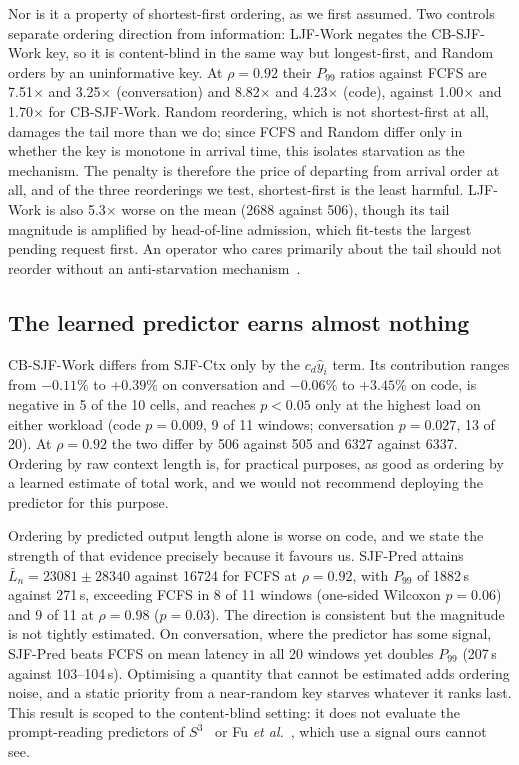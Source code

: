 \documentclass[conference,10pt,letterpaper]{IEEEtran}
\begin{document}
Nor is it a property of shortest-first ordering, as we first assumed. Two
controls separate ordering direction from information: LJF-Work negates the
CB-SJF-Work key, so it is content-blind in the same way but longest-first, and
Random orders by an uninformative key. At $\rho=0.92$ their $P_{99}$ ratios
against FCFS are 7.51$\times$ and 3.25$\times$ (conversation) and 8.82$\times$
and 4.23$\times$ (code), against 1.00$\times$ and 1.70$\times$ for CB-SJF-Work.
Random reordering, which is not shortest-first at all, damages the tail more
than we do; since FCFS and Random differ only in whether the key is monotone in
arrival time, this isolates starvation as the mechanism. The penalty is
therefore the price of departing from arrival order at all, and of the three
reorderings we test, shortest-first is the least harmful. LJF-Work is also
5.3$\times$ worse on the mean (2688 against 506), though its tail magnitude is
amplified by head-of-line admission, which fit-tests the largest pending request
first. An operator who cares primarily about the tail should not reorder without
an anti-starvation mechanism~\cite{wu2026fastserve,pecsched}.

\subsection{The learned predictor earns almost nothing}
CB-SJF-Work differs from SJF-Ctx only by the $c_d \hat{y}_i$ term. Its
contribution ranges from $-0.11\%$ to $+0.39\%$ on conversation and $-0.06\%$ to
$+3.45\%$ on code, is negative in 5 of the 10 cells, and reaches $p<0.05$ only
at the highest load on either workload (code $p=0.009$, 9 of 11 windows;
conversation $p=0.027$, 13 of 20). At $\rho=0.92$ the two differ by 506 against
505 and 6327 against 6337. Ordering by raw context length is, for practical
purposes, as good as ordering by a learned estimate of total work, and we would
not recommend deploying the predictor for this purpose.

Ordering by predicted output length alone is worse on code, and we state the
strength of that evidence precisely because it favours us. SJF-Pred attains
$\bar{L}_n = 23081 \pm 28340$ against 16724 for FCFS at $\rho=0.92$, with
$P_{99}$ of 1882\,s against 271\,s, exceeding FCFS in 8 of 11 windows (one-sided
Wilcoxon $p=0.06$) and 9 of 11 at $\rho=0.98$ ($p=0.03$). The direction is
consistent but the magnitude is not tightly estimated. On conversation, where
the predictor has some signal, SJF-Pred beats FCFS on mean latency in all 20
windows yet doubles $P_{99}$ (207\,s against 103--104\,s). Optimising a quantity
that cannot be estimated adds ordering noise, and a static priority from a
near-random key starves whatever it ranks last. This result is scoped to the
content-blind setting: it does not evaluate the prompt-reading predictors of
$S^3$~\cite{jin2023s3} or Fu \emph{et al.}~\cite{fu2024ltr}, which use a signal
ours cannot see.
\end{document}
